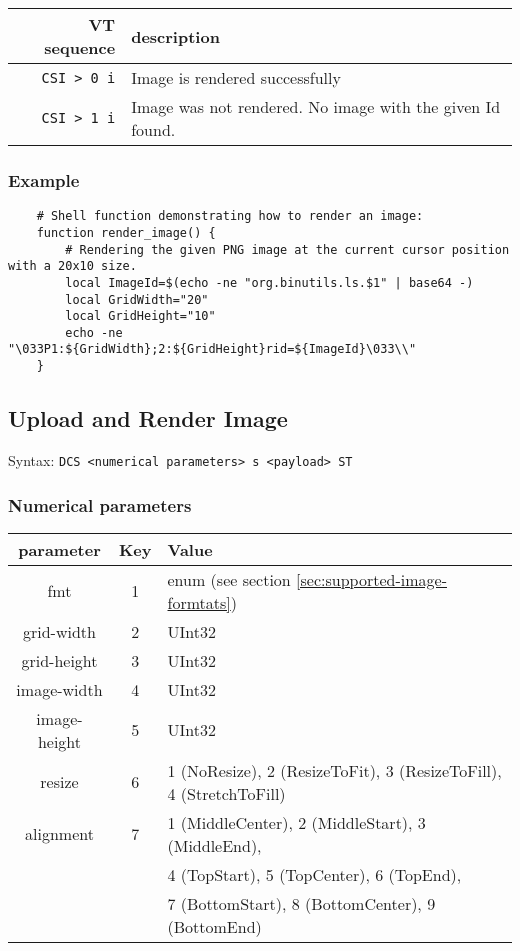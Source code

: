\documentclass{article}
\newcommand{\code}[1]{\colorbox{light-gray}{\texttt{#1}}}
\begin{document}
\begin{tabular}{ |r|l| }
    \hline
    \textbf{VT sequence} & \textbf{description} \\
    \hline
    \code{CSI > 0 i} & Image is rendered successfully \\
    \code{CSI > 1 i} & Image was not rendered. No image with the given Id found. \\
    \hline
\end{tabular}

\subsubsection*{Example}

\begin{verbatim}
    # Shell function demonstrating how to render an image:
    function render_image() {
        # Rendering the given PNG image at the current cursor position with a 20x10 size.
        local ImageId=$(echo -ne "org.binutils.ls.$1" | base64 -)
        local GridWidth="20"
        local GridHeight="10"
        echo -ne "\033P1:${GridWidth};2:${GridHeight}rid=${ImageId}\033\\"
    }
\end{verbatim}

\subsection{Upload and Render Image}

Syntax: \code{DCS <numerical parameters> s <payload> ST}

\subsubsection*{Numerical parameters}

\begin{tabular}{ |c|c|l| }
    \hline
    \textbf{parameter}   & \textbf{Key} & \textbf{Value} \\
    \hline
    fmt         & 1   & enum (see section \ref{sec:supported-image-formtats}) \\
    grid-width  & 2   & UInt32 \\
    grid-height & 3   & UInt32 \\
    image-width & 4   & UInt32 \\
    image-height& 5   & UInt32 \\
    resize      & 6   & 1 (NoResize), 2 (ResizeToFit), 3 (ResizeToFill), 4 (StretchToFill) \\
    alignment   & 7   & 1 (MiddleCenter), 2 (MiddleStart), 3 (MiddleEnd), \\
                &     & 4 (TopStart), 5 (TopCenter), 6 (TopEnd), \\
                &     & 7 (BottomStart), 8 (BottomCenter), 9 (BottomEnd) \\
    \hline
\end{tabular}
\end{document}
